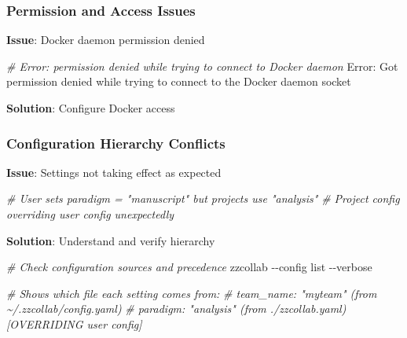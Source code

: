\documentclass[
]{article}
\newenvironment{Shaded}{\begin{snugshade}}{\end{snugshade}}
\newcommand{\AttributeTok}[1]{\textcolor[rgb]{0.13,0.29,0.53}{#1}}
\newcommand{\CommentTok}[1]{\textcolor[rgb]{0.56,0.35,0.01}{\textit{#1}}}
\newcommand{\ExtensionTok}[1]{#1}
\newcommand{\FunctionTok}[1]{\textcolor[rgb]{0.13,0.29,0.53}{\textbf{#1}}}
\newcommand{\NormalTok}[1]{#1}
\newcommand{\VariableTok}[1]{\textcolor[rgb]{0.00,0.00,0.00}{#1}}
\begin{document}
\subsubsection{Permission and Access
Issues}\label{permission-and-access-issues}

\textbf{Issue}: Docker daemon permission denied

\begin{Shaded}
\begin{Highlighting}[]
\CommentTok{\# Error: permission denied while trying to connect to Docker daemon}
\ExtensionTok{Error:}\NormalTok{ Got permission denied while trying to connect to the Docker daemon socket}
\end{Highlighting}
\end{Shaded}

\textbf{Solution}: Configure Docker access

\begin{Shaded}
\end{Shaded}

\subsubsection{Configuration Hierarchy
Conflicts}\label{configuration-hierarchy-conflicts}

\textbf{Issue}: Settings not taking effect as expected

\begin{Shaded}
\begin{Highlighting}[]
\CommentTok{\# User sets paradigm = "manuscript" but projects use "analysis"}
\CommentTok{\# Project config overriding user config unexpectedly}
\end{Highlighting}
\end{Shaded}

\textbf{Solution}: Understand and verify hierarchy

\begin{Shaded}
\begin{Highlighting}[]
\CommentTok{\# Check configuration sources and precedence}
\ExtensionTok{zzcollab} \AttributeTok{{-}{-}config}\NormalTok{ list }\AttributeTok{{-}{-}verbose}

\CommentTok{\# Shows which file each setting comes from:}
\CommentTok{\# team\_name: "myteam" (from \textasciitilde{}/.zzcollab/config.yaml)}
\CommentTok{\# paradigm: "analysis" (from ./zzcollab.yaml) [OVERRIDING user config]}
\end{Highlighting}
\end{Shaded}
\end{document}
